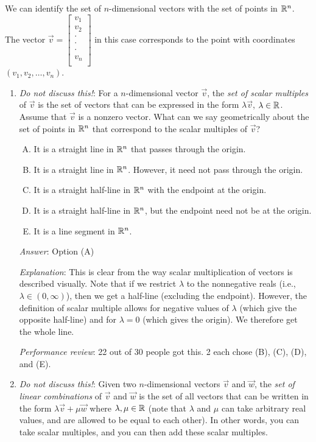 \documentclass[10pt]{amsart}
\begin{document}
We can identify the set of $n$-dimensional vectors with the set of
points in $\mathbb{R}^n$. The vector $\vec{v} = \left[\begin{matrix}
    v_1 \\ v_2 \\ \cdot \\ \cdot \\ \cdot \\ v_n
    \\\end{matrix}\right]$ in this case corresponds to the point with
coordinates $(v_1,v_2,\dots,v_n)$.

\begin{enumerate}
\item {\em Do not discuss this!}: For a $n$-dimensional vector
  $\vec{v}$, the {\em set of scalar multiples} of $\vec{v}$ is the set
  of vectors that can be expressed in the form $\lambda \vec{v}$,
  $\lambda \in \mathbb{R}$. Assume that $\vec{v}$ is a nonzero vector. What
  can we say geometrically about the set of points in $\mathbb{R}^n$ that
  correspond to the scalar multiples of $\vec{v}$?

  \begin{enumerate}[(A)]
  \item It is a straight line in $\mathbb{R}^n$ that passes through the
    origin.
  \item It is a straight line in $\mathbb{R}^n$. However, it need not pass
    through the origin.
  \item It is a straight half-line in $\mathbb{R}^n$ with the endpoint at the
    origin.
  \item It is a straight half-line in $\mathbb{R}^n$, but the endpoint need
    not be at the origin.
  \item It is a line segment in $\mathbb{R}^n$.
  \end{enumerate}

  {\em Answer}: Option (A)

  {\em Explanation}: This is clear from the way scalar multiplication
  of vectors is described visually. Note that if we restrict $\lambda$
  to the nonnegative reals (i.e., $\lambda \in (0,\infty)$), then we
  get a half-line (excluding the endpoint). However, the definition of
  scalar multiple allows for negative values of $\lambda$ (which give
  the opposite half-line) and for $\lambda = 0$ (which gives the
  origin). We therefore get the whole line.

  {\em Performance review}: 22 out of 30 people got this. 2 each chose
  (B), (C), (D), and (E).
\item {\em Do not discuss this!}: Given two $n$-dimensional vectors
  $\vec{v}$ and $\vec{w}$, the {\em set of linear combinations} of
  $\vec{v}$ and $\vec{w}$ is the set of all vectors that can be
  written in the form $\lambda \vec{v} + \mu \vec{w}$ where
  $\lambda,\mu \in \mathbb{R}$ (note that $\lambda$ and $\mu$ can take
  arbitrary real values, and are allowed to be equal to each
  other). In other words, you can take scalar multiples, and you can
  then add these scalar multiples.


\end{enumerate}
\end{document}
